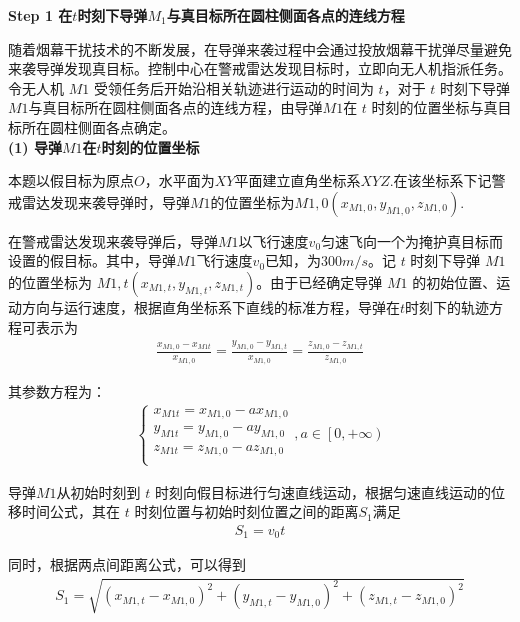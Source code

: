 \documentclass[../main.tex]{subfiles}
\begin{document}
\noindent \textbf{Step 1 在\( t \)时刻下导弹\( M_1 \)与真目标所在圆柱侧面各点的连线方程}
\par 随着烟幕干扰技术的不断发展，在导弹来袭过程中会通过投放烟幕干扰弹尽量避免来袭导弹发现真目标。控制中心在警戒雷达发现目标时，立即向无人机指派任务。令无人机 \( M1 \) 受领任务后开始沿相关轨迹进行运动的时间为 \( t \)，对于 \( t \) 时刻下导弹 \( M1 \)与真目标所在圆柱侧面各点的连线方程，由导弹$M1$在 \( t \) 时刻的位置坐标与真目标所在圆柱侧面各点确定。
\\
\textbf{(1) 导弹$M1$在\( t \)时刻的位置坐标}
\par 本题以假目标为原点$O$，水平面为$XY$平面建立直角坐标系$XYZ$.在该坐标系下记警戒雷达发现来袭导弹时，导弹$M1$的位置坐标为\( M{1,0}(x_{M{1,0}}, y_{M{1,0}}, z_{M{1,0}}) \).
\par 在警戒雷达发现来袭导弹后，导弹\( M1 \)以飞行速度\( v_0 \)匀速飞向一个为掩护真目标而设置的假目标。其中，导弹$M1$飞行速度\( v_0 \)已知，为$300m/s$。记 \( t \) 时刻下导弹 \( M1 \) 的位置坐标为 \( M1,t(x_{M1,t}, y_{M1,t}, z_{M1,t}) \)。由于已经确定导弹 \( M1 \) 的初始位置、运动方向与运行速度，根据直角坐标系下直线的标准方程，导弹在$t$时刻下的轨迹方程可表示为
\begin{align}\label{1.1}
\frac{x_{M1,0}-x_{M1t}}{x_{M1,0}}=\frac{y_{M1,0}-y_{M1,t}}{x_{M1,0}}=\frac{z_{M1,0}-z_{M1,t}}{z_{M1,0}}
\end{align}
\par 其参数方程为：
\begin{align}\label{1.2}
\left\{ \begin{array}{l}
x_{M1t}=x_{M1,0}-ax_{M1,0}\\
y_{M1t}=y_{M1,0}-ay_{M1,0}\\
z_{M1t}=z_{M1,0}-az_{M1,0}\\
\end{array} \right. ,a\in \left[ 0,+\infty \right)
\end{align}
\par 导弹$M1$从初始时刻到 \( t \) 时刻向假目标进行匀速直线运动，根据匀速直线运动的位移时间公式，其在 $t$ 时刻位置与初始时刻位置之间的距离$S_1$满足
\begin{align}\label{1.5}
S_1 = v_0 t
\end{align}
\par 同时，根据两点间距离公式，可以得到
\begin{align}\label{1.3}
S_1 =  \sqrt{(x_{M1,t} - x_{M1,0})^2 + (y_{M1,t} - y_{M1,0})^2 + (z_{M1,t} - z_{M1,0})^2}
\end{align}
\end{document}
